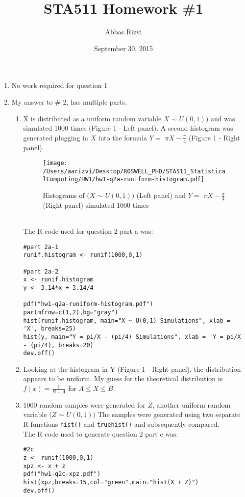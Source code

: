 \documentclass[letterpaper]{article}
\begin{document}


\title{STA511 Homework \#1}
\date{September 30, 2015}
\author{Abbas Rizvi}
\maketitle

\begin{enumerate}

\item No work required for question 1

\item My answer to \# 2, has multiple parts.

\begin{enumerate}
\item X is distributed as a uniform random variable $X$ $\sim$ $U(0,1))$ and was simulated 1000 times (Figure 1 - Left panel). A second histogram was generated plugging in $X$ into the formula $Y = $ $\pi$$X - \frac{\pi}{4}$ (Figure 1 - Right panel).
\begin{figure}[htpb]
\centering
\caption{Histograms of $(X$ $\sim$ $U(0,1))$ (Left panel) and $Y = $ $\pi$$X - \frac{\pi}{4}$ (Right panel) simulated 1000 times}
\centering
\texttt{[image: /Users/aarizvi/Desktop/ROSWELL\_PHD/STA511\_StatisticalComputing/HW1/hw1-q2a-runiform-histogram.pdf]}
\end{figure}
\\
The R code used for question 2 part a was:
\begin{verbatim}
#part 2a-1
runif.histogram <- runif(1000,0,1)

#part 2a-2
x <- runif.histogram
y <- 3.14*x + 3.14/4

pdf("hw1-q2a-runiform-histogram.pdf")
par(mfrow=c(1,2),bg="gray")
hist(runif.histogram, main="X ~ U(0,1) Simulations", xlab = 'X', breaks=25)
hist(y, main="Y = pi/X - (pi/4) Simulations", xlab = 'Y = pi/X - (pi/4), breaks=20)
dev.off()
\end{verbatim}

\item Looking at the histogram in Y (Figure 1 - Right panel), the distribution appears to be uniform. My guess for the theoretical distribution is $f(x) = \frac{1}{B - A}$ for $A \leq X \leq B$. 

\item 1000 random samples were generated for $Z$, another uniform random variable ($Z$ $\sim$ $U(0,1))$ The samples were generated using two separate R functions {\tt{hist()}} and {\tt{truehist()}} and subsequently compared.
\\
The R code used to generate question 2 part c was:
\begin{verbatim}
#2c 
z <- runif(1000,0,1)
xpz <- x + z
pdf("hw1-q2c-xpz.pdf")
hist(xpz,breaks=15,col="green",main="hist(X + Z)")
dev.off()


\end{verbatim}
\end{enumerate}
\end{enumerate}
\end{document}
